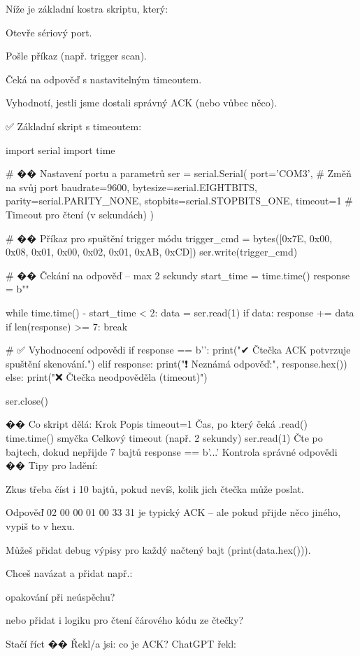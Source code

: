 Níže je základní kostra skriptu, který:

    Otevře sériový port.

    Pošle příkaz (např. trigger scan).

    Čeká na odpověď s nastavitelným timeoutem.

    Vyhodnotí, jestli jsme dostali správný ACK (nebo vůbec něco).

✅ Základní skript s timeoutem:

import serial
import time

# �� Nastavení portu a parametrů
ser = serial.Serial(
    port='COM3',        # Změň na svůj port
    baudrate=9600,
    bytesize=serial.EIGHTBITS,
    parity=serial.PARITY_NONE,
    stopbits=serial.STOPBITS_ONE,
    timeout=1           # Timeout pro čtení (v sekundách)
)

# �� Příkaz pro spuštění trigger módu
trigger_cmd = bytes([0x7E, 0x00, 0x08, 0x01, 0x00, 0x02, 0x01, 0xAB, 0xCD])
ser.write(trigger_cmd)

# �� Čekání na odpověď – max 2 sekundy
start_time = time.time()
response = b""

while time.time() - start_time < 2:
    data = ser.read(1)
    if data:
        response += data
        if len(response) >= 7:
            break

# ✅ Vyhodnocení odpovědi
if response == b'':
    print("✔ Čtečka ACK potvrzuje spuštění skenování.")
elif response:
    print("❗ Neznámá odpověď:", response.hex())
else:
    print("❌ Čtečka neodpověděla (timeout)")

ser.close()

�� Co skript dělá:
Krok	Popis
timeout=1	Čas, po který čeká .read()
time.time() smyčka	Celkový timeout (např. 2 sekundy)
ser.read(1)	Čte po bajtech, dokud nepřijde 7 bajtů
response == b'...'	Kontrola správné odpovědi
�� Tipy pro ladění:

    Zkus třeba číst i 10 bajtů, pokud nevíš, kolik jich čtečka může poslat.

    Odpověď 02 00 00 01 00 33 31 je typický ACK – ale pokud přijde něco jiného, vypiš to v hexu.

    Můžeš přidat debug výpisy pro každý načtený bajt (print(data.hex())).

Chceš navázat a přidat např.:

    opakování při neúspěchu?

    nebo přidat i logiku pro čtení čárového kódu ze čtečky?

Stačí říct ��
Řekl/a jsi:
co je ACK?
ChatGPT řekl:

